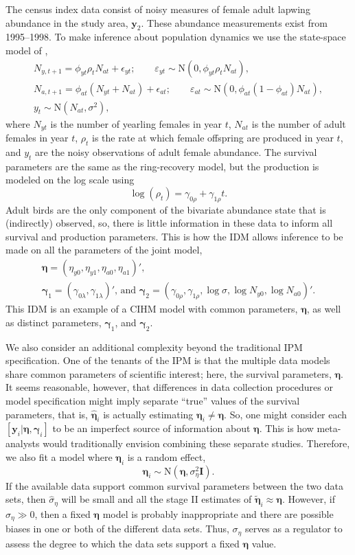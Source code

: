 \documentclass[12pt]{article}
\newcommand{\by}{\mathbf{y}}
\newcommand{\bn}{\boldsymbol{\eta}}
\newcommand{\bg}{\boldsymbol{\gamma}}
\newcommand{\tN}{\text{N}}
\newcommand{\bI}{\mathbf{I}}
\begin{document}
The census index data consist of noisy measures of female adult lapwing abundance in the study area, $\by_2$. These abundance measurements exist from 1995--1998. To make inference about population dynamics we use the state-space model of \citet{besbeas2002integrating},
\begin{equation}
\begin{gathered}
N_{y,t+1} = \phi_{yt} \rho_t N_{at} + \epsilon_{yt};\qquad \varepsilon_{yt} \sim \tN(0, \phi_{yt} \rho_t N_{at}),\\
N_{a,t+1} = \phi_{at} (N_{yt} + N_{at}) + \epsilon_{at};\qquad \varepsilon_{at} \sim \tN(0, \phi_{at} (1-\phi_{at}) N_{at}),\\
y_{t} \sim \tN(N_{at}, \sigma^2),
\end{gathered}
\end{equation}
where $N_{yt}$ is the number of yearling females in year $t$, $N_{at}$ is the number of adult females in year $t$, $\rho_t$ is the rate at which female offspring are produced in year $t$, and $y_t$ are the noisy observations of adult female abundance. The survival parameters are the same as the ring-recovery model, but the production is modeled on the log scale using
\[
\log (\rho_t) = \gamma_{0\rho} + \gamma_{1\rho} t.
\]
Adult birds are the only component of the bivariate abundance state that is (indirectly) observed, so, there is little information in these data to inform all survival and production parameters. This is how the IDM allows inference to be made on all the parameters of the joint model, 
\[
\begin{gathered} 
\bn = (\eta_{y0}, \eta_{y1}, \eta_{a0}, \eta_{a1})',  \\
\bg_1 = (\gamma_{0\lambda}, \gamma_{1\lambda})' \text{, and } \bg_2 = (\gamma_{0\rho}, \gamma_{1\rho}, \log\sigma, \log N_{y0}, \log N_{a0})'.
\end{gathered}
\]
This IDM is an example of a CIHM model with common parameters, $\bn$, as well as distinct parameters, $\bg_1$, and $\bg_2$. 

We also consider an additional complexity beyond the traditional IPM specification. One of the tenants of the IPM is that the multiple data models share common parameters of scientific interest; here, the survival parameters, $\bn$. It seems reasonable, however, that differences in data collection procedures or model specification might imply separate ``true'' values of the survival parameters, that is, $\hat{\bn}_i$ is actually estimating $\bn_i\ne\bn$. So, one might consider each $[\by_i|\bn,\bg_i]$ to be an imperfect source of information about $\bn$. This is how meta-analysts would traditionally envision combining these separate studies. Therefore, we also fit a model where $\bn_i$ is a random effect, 
\[
\bn_i \sim \tN(\bn, \sigma^2_\eta\bI).
\]
If the available data support common survival parameters between the two data sets, then $\hat{\sigma}_\eta$ will be small and all the stage II estimates of $\tilde{\bn}_i \approx \bn$. However, if $\sigma_\eta \gg 0$, then a fixed $\bn$ model is probably inappropriate and there are possible biases in one or both of the different data sets. Thus, $\sigma_\eta$ serves as a regulator to assess the degree to which the data sets support a fixed $\bn$ value.
\end{document}
